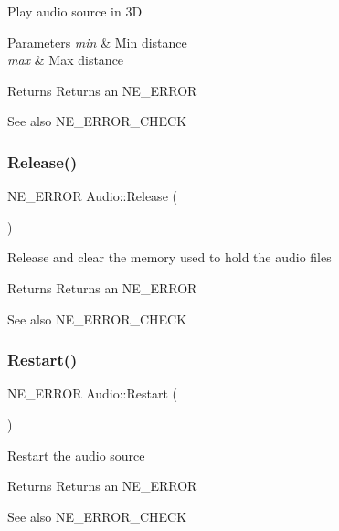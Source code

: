 Play audio source in 3D 
\begin{DoxyParams}{Parameters}
{\em min} & Min distance \\
\hline
{\em max} & Max distance \\
\hline
\end{DoxyParams}
\begin{DoxyReturn}{Returns}
Returns an N\+E\+\_\+\+E\+R\+R\+OR 
\end{DoxyReturn}
\begin{DoxySeeAlso}{See also}
N\+E\+\_\+\+E\+R\+R\+O\+R\+\_\+\+C\+H\+E\+CK 
\end{DoxySeeAlso}
\mbox{\label{class_audio_a0adb187aa96b0c2115d69c70c83b2277}} 
\subsubsection{\texorpdfstring{Release()}{Release()}}
{\footnotesize\ttfamily N\+E\+\_\+\+E\+R\+R\+OR Audio\+::\+Release (\begin{DoxyParamCaption}{ }\end{DoxyParamCaption})}

Release and clear the memory used to hold the audio files \begin{DoxyReturn}{Returns}
Returns an N\+E\+\_\+\+E\+R\+R\+OR 
\end{DoxyReturn}
\begin{DoxySeeAlso}{See also}
N\+E\+\_\+\+E\+R\+R\+O\+R\+\_\+\+C\+H\+E\+CK 
\end{DoxySeeAlso}
\mbox{\label{class_audio_ae2bcb6b054a71006cc8ac03ff62d5d96}} 
\subsubsection{\texorpdfstring{Restart()}{Restart()}}
{\footnotesize\ttfamily N\+E\+\_\+\+E\+R\+R\+OR Audio\+::\+Restart (\begin{DoxyParamCaption}{ }\end{DoxyParamCaption})}

Restart the audio source \begin{DoxyReturn}{Returns}
Returns an N\+E\+\_\+\+E\+R\+R\+OR 
\end{DoxyReturn}
\begin{DoxySeeAlso}{See also}
N\+E\+\_\+\+E\+R\+R\+O\+R\+\_\+\+C\+H\+E\+CK 
\end{DoxySeeAlso}
\mbox{\label{class_audio_a141af36f2bb5f0d6e655efc81bf3d365}} 
